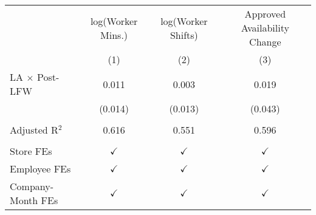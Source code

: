 
\begingroup
\centering
\scriptsize
\begin{tabular}{lccc}
   \toprule
                         & log(Worker Mins.)    & log(Worker Shifts)   & Approved Availability Change\\  
                         & (1)           & (2)           & (3)\\  
   \midrule 
   LA $\times$ Post-LFW  & 0.011         & 0.003         & 0.019\\   
                         & (0.014)       & (0.013)       & (0.043)\\   
    \\
   Adjusted R$^2$        & 0.616         & 0.551         & 0.596\\  
    \\
   Store FEs             & $\checkmark$  & $\checkmark$  & $\checkmark$\\   
   Employee FEs          & $\checkmark$  & $\checkmark$  &$\checkmark$  \\  
   Company-Month FEs     & $\checkmark$  & $\checkmark$  & $\checkmark$\\   
   \bottomrule
\end{tabular}
\par\endgroup


